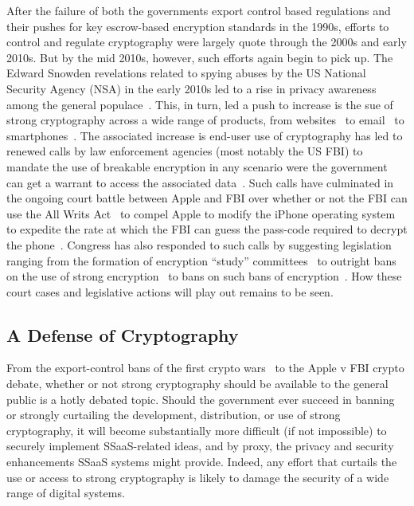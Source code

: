 After the failure of both the governments export control based
regulations and their pushes for key escrow-based encryption standards
in the 1990s, efforts to control and regulate cryptography were
largely quote through the 2000s and early 2010s. But by the mid 2010s,
however, such efforts again begin to pick up. The Edward Snowden
revelations related to spying abuses by the US National Security
Agency (NSA) in the early 2010s led to a rise in privacy awareness
among the general populace~\cite{pew-privsec14}. This, in turn, led a
push to increase is the sue of strong cryptography across a wide range
of products, from websites~\cite{mozilla-deprecatehttp} to
email~\cite{gmail-blog-encryption} to
smartphones~\cite{ars-ios-encrypt, ars-android-encrypt}. The
associated increase is end-user use of cryptography has led to renewed
calls by law enforcement agencies (most notably the US FBI) to mandate
the use of breakable encryption in any scenario were the government
can get a warrant to access the associated
data~\cite{comey-testimony-encryption}. Such calls have culminated in
the ongoing court battle between Apple and FBI over whether or not the
FBI can use the All Writs Act~\cite{usc-allwrits} to compel Apple to
modify the iPhone operating system to expedite the rate at which the
FBI can guess the pass-code required to decrypt the
phone~\cite{ars-cookvfbi}. Congress has also responded to such calls
by suggesting legislation ranging from the formation of encryption
``study'' committees~\cite{hr4651} to outright bans on the use of
strong encryption~\cite{bennett-burrbill} to bans on such bans of
encryption~\cite{hr4528}. How these court cases and legislative
actions will play out remains to be seen.

\subsection{A Defense of Cryptography}

From the export-control bans of the first crypto wars~\cite{kehl2015}
to the Apple v FBI crypto debate, whether or not strong cryptography
should be available to the general public is a hotly debated
topic. Should the government ever succeed in banning or strongly
curtailing the development, distribution, or use of strong
cryptography, it will become substantially more difficult (if not
impossible) to securely implement SSaaS-related ideas, and by proxy,
the privacy and security enhancements SSaaS systems might
provide. Indeed, any effort that curtails the use or access to strong
cryptography is likely to damage the security of a wide range of digital
systems.


